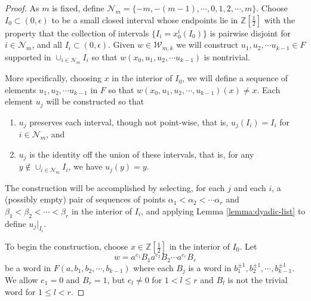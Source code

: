 \documentclass[11pt]{amsart}
\begin{document}
\begin{proof}
As $m$ is fixed, define ${\mathcal N}_m = \{-m,-(m-1), \cdots
,0,1,2, \cdots ,m\}$.  Choose $I_0 \subset (0,\epsilon)$ to be
a small closed interval whose endpoints lie in ${\mathbb Z}[\frac{1}{2}]$
with the property that the collection of intervals
$\{I_i=x_0^i(I_0)\}$ is pairwise disjoint for $i \in {\mathcal
N}_m$, and all $I_i \subset (0,\epsilon)$. Given $w \in {{\mathcal W}_{m,k}}$ we
will construct $u_1,u_2, \cdots u_{k-1} \in F$ supported in
$\cup_{i \in {\mathcal N}_m} I_i$ so that $w(x_0,u_1,u_2, \cdots
u_{k-1})$ is nontrivial.

More specifically, choosing $x$ in the interior of $I_0$, we will
define a sequence of elements $u_1,u_2, \cdots u_{k-1}$ in $F$ so
that $w(x_0,u_1,u_2, \cdots ,u_{k-1})(x) \neq x$.  Each element
$u_j$ will be constructed so that
\begin{enumerate}
\item $u_j$ preserves each interval, though not point-wise, that is, $u_j(I_i) = I_i$ for $i \in {\mathcal N}_m$, and
\item $u_j$ is the identity off the union of these intervals, that is, for any $y \notin \cup_{i \in {\mathcal N}_m} I_i$, we have $u_j(y)=y$.
\end{enumerate}
The construction will be accomplished by selecting, for each $j$
and each $i$, a (possibly empty) pair of sequences of points
$\alpha_1 < \alpha_2 < \cdots \alpha_r$ and $\beta_1 < \beta_2 <
\cdots < \beta_r$ in the interior of $I_i$, and applying Lemma
\ref{lemma:dyadic-list} to define $u_j|_{I_i}$.

To begin the construction, choose $x \in {\mathbb Z}[\frac{1}{2}]$
in the interior of $I_0$. Let $$w=a^{e_1}B_1 a^{e_2} B_2 \cdots
a^{e_r}B_r$$ be a word in $F(a,b_1,b_2, \cdots ,b_{k-1})$ where
each $B_j$ is a word in $b_1^{\pm 1},b_2^{\pm 1}, \cdots
,b_{k-1}^{\pm 1}$. We allow $e_1 = 0$ and $B_r = 1$, but $e_l \neq
0$ for $1<l\leq r$ and $B_l$ is not the trivial word for $1 \leq l
 < r$.


\end{proof}
\end{document}
